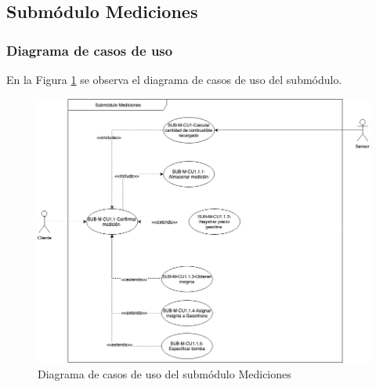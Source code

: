 \subsection{Submódulo Mediciones}
\subsubsection{Diagrama de casos de uso}
En la Figura \ref{fig:dcu-mediciones} se observa el diagrama de casos de uso del submódulo.
\begin{figure}[H]
	\centering
	\includegraphics[scale=.5]{Capitulo4/software/submodulos/mediciones/images/dcu}
	\caption{Diagrama de casos de uso del submódulo Mediciones}
	\label{fig:dcu-mediciones}
\end{figure}
\newpage






